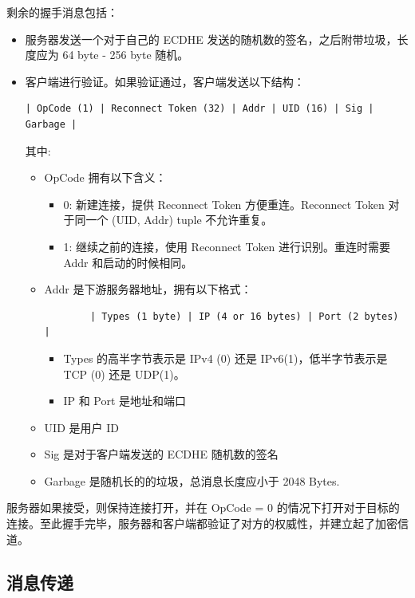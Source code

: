 \documentclass{ctexart}
\begin{document}
  剩余的握手消息包括：

  \begin{itemize}
    \item 服务器发送一个对于自己的 ECDHE 发送的随机数的签名，之后附带垃圾，长度应为 64 byte - 256 byte 随机。
    \item 客户端进行验证。如果验证通过，客户端发送以下结构：

    \begin{verbatim}
| OpCode (1) | Reconnect Token (32) | Addr | UID (16) | Sig | Garbage |
    \end{verbatim}

    其中:
    \begin{itemize}
      \item OpCode 拥有以下含义：
      \begin{itemize}
        \item 0: 新建连接，提供 Reconnect Token 方便重连。Reconnect Token 对于同一个 (UID, Addr) tuple 不允许重复。
        \item 1: 继续之前的连接，使用 Reconnect Token 进行识别。重连时需要 Addr 和启动的时候相同。
      \end{itemize}
      \item Addr 是下游服务器地址，拥有以下格式：
      \begin{verbatim}
        | Types (1 byte) | IP (4 or 16 bytes) | Port (2 bytes) |
      \end{verbatim}
      \begin{itemize}
        \item Types 的高半字节表示是 IPv4 (0) 还是 IPv6(1)，低半字节表示是 TCP (0) 还是 UDP(1)。
        \item IP 和 Port 是地址和端口
      \end{itemize}
      \item UID 是用户 ID
      \item Sig 是对于客户端发送的 ECDHE 随机数的签名
      \item Garbage 是随机长的的垃圾，总消息长度应小于 2048 Bytes.
    \end{itemize} 
  \end{itemize}

  服务器如果接受，则保持连接打开，并在 OpCode = 0 的情况下打开对于目标的连接。至此握手完毕，服务器和客户端都验证了对方的权威性，并建立起了加密信道。

  \subsection{消息传递}
\end{document}
